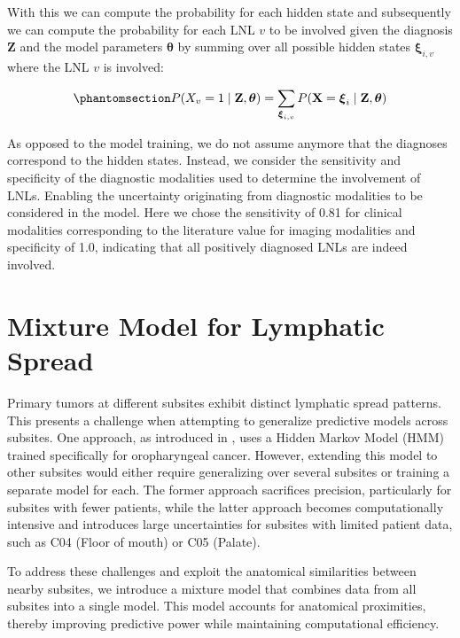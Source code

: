 \documentclass[
  sn-mathphys-num,
]{sn-jnl}
\begin{document}
With this we can compute the probability for each hidden state and
subsequently we can compute the probability for each LNL \(v\) to be
involved given the diagnosis \(\mathbf{Z}\) and the model parameters
\(\boldsymbol{\theta}\) by summing over all possible hidden states
\(\boldsymbol{\xi}_{i,v}\) where the LNL \(v\) is involved:

\begin{equation}\phantomsection\label{eq-risk}{
P(X_v=1 \mid \mathbf{Z}, \boldsymbol{\theta}) = \sum_{\boldsymbol{\xi}_{i,v}} P(\mathbf{X} =\boldsymbol{\xi}_i \mid \mathbf{Z}, \boldsymbol{\theta})
}\end{equation}

As opposed to the model training, we do not assume anymore that the
diagnoses correspond to the hidden states. Instead, we consider the
sensitivity and specificity of the diagnostic modalities used to
determine the involvement of LNLs. Enabling the uncertainty originating
from diagnostic modalities to be considered in the model. Here we chose
the sensitivity of 0.81 for clinical modalities corresponding to the
literature value for imaging modalities \citep{de_bondt_detection_2007}
and specificity of 1.0, indicating that all positively diagnosed LNLs
are indeed involved.

\section{Mixture Model for Lymphatic Spread}\label{sec-mixture}

Primary tumors at different subsites exhibit distinct lymphatic spread
patterns. This presents a challenge when attempting to generalize
predictive models across subsites. One approach, as introduced in
\citep{ludwig_dynamic_2021}, uses a Hidden Markov Model (HMM) trained
specifically for oropharyngeal cancer. However, extending this model to
other subsites would either require generalizing over several subsites
or training a separate model for each. The former approach sacrifices
precision, particularly for subsites with fewer patients, while the
latter approach becomes computationally intensive and introduces large
uncertainties for subsites with limited patient data, such as C04 (Floor
of mouth) or C05 (Palate).

To address these challenges and exploit the anatomical similarities
between nearby subsites, we introduce a mixture model that combines data
from all subsites into a single model. This model accounts for
anatomical proximities, thereby improving predictive power while
maintaining computational efficiency.
\end{document}

